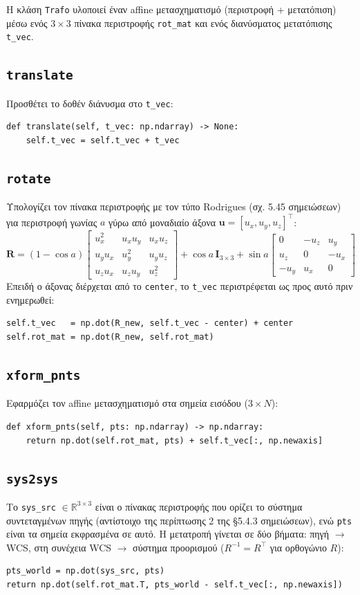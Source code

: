 \documentclass{article}
\begin{document}
Η κλάση \texttt{Trafo} υλοποιεί έναν affine μετασχηματισμό (περιστροφή + μετατόπιση)
μέσω ενός $3\times3$ πίνακα περιστροφής \texttt{rot\_mat} και ενός διανύσματος
μετατόπισης \texttt{t\_vec}.

\subsection{\texttt{translate}}
Προσθέτει το δοθέν διάνυσμα στο \texttt{t\_vec}:
\begin{lstlisting}
def translate(self, t_vec: np.ndarray) -> None:
    self.t_vec = self.t_vec + t_vec
\end{lstlisting}

\subsection{\texttt{rotate}}
Υπολογίζει τον πίνακα περιστροφής με τον τύπο Rodrigues (σχ. 5.45 σημειώσεων) για
περιστροφή γωνίας $a$ γύρω από μοναδιαίο άξονα $\mathbf{u} = [u_x, u_y, u_z]^\top$:
\[
\mathbf{R} = (1-\cos a)
\begin{bmatrix} u_x^2 & u_x u_y & u_x u_z \\ u_y u_x & u_y^2 & u_y u_z \\ u_z u_x & u_z u_y & u_z^2 \end{bmatrix}
+ \cos a\, \mathbf{I}_{3\times3}
+ \sin a
\begin{bmatrix} 0 & -u_z & u_y \\ u_z & 0 & -u_x \\ -u_y & u_x & 0 \end{bmatrix}
\]
Επειδή ο άξονας διέρχεται από το \texttt{center}, το \texttt{t\_vec}
περιστρέφεται ως προς αυτό πριν ενημερωθεί:
\begin{lstlisting}
self.t_vec   = np.dot(R_new, self.t_vec - center) + center
self.rot_mat = np.dot(R_new, self.rot_mat)
\end{lstlisting}

\subsection{\texttt{xform\_pnts}}
Εφαρμόζει τον affine μετασχηματισμό στα σημεία εισόδου ($3\times N$):
\begin{lstlisting}
def xform_pnts(self, pts: np.ndarray) -> np.ndarray:
    return np.dot(self.rot_mat, pts) + self.t_vec[:, np.newaxis]
\end{lstlisting}

\subsection{\texttt{sys2sys}}
Το \texttt{sys\_src} $\in\mathbb{R}^{3\times3}$ είναι ο πίνακας περιστροφής
που ορίζει το σύστημα συντεταγμένων πηγής (αντίστοιχο της περίπτωσης 2 της
§5.4.3 σημειώσεων), ενώ \texttt{pts} είναι τα σημεία εκφρασμένα σε αυτό.
Η μετατροπή γίνεται σε δύο βήματα: πηγή $\to$ WCS, στη συνέχεια WCS $\to$
σύστημα προορισμού ($R^{-1}=R^\top$ για ορθογώνιο $R$):
\begin{lstlisting}
pts_world = np.dot(sys_src, pts)
return np.dot(self.rot_mat.T, pts_world - self.t_vec[:, np.newaxis])
\end{lstlisting}
\end{document}
